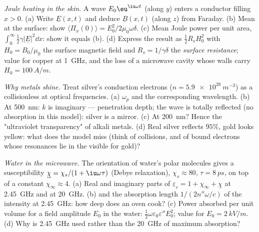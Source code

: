 \begin{exercise}[$\star\star\star$]\label{exo:b2:waves-in-media:10}
\emph{Joule heating in the skin.} A wave $E_0\eu^{\iu\omega t}$ (along $y$)
enters a conductor filling $x > 0$. (a) Write $\underline E(x, t)$ and deduce
$\underline B(x, t)$ (along $z$) from Faraday. (b) Mean  at the
surface: show $\langle\Pi_x(0)\rangle = E_0^2/2\mu_0\omega\delta$. (c) Mean Joule
power per unit area, $\int_0^\infty\tfrac12\gamma|\underline E|^2\dd x$: show it equals
(b). (d) Express the result as $\tfrac12R_sH_0^2$ with $H_0 = B_0/\mu_0$ the
surface magnetic field and $R_s = 1/\gamma\delta$ the \emph{surface
resistance}; value for copper at \qty{1}{GHz}, and the loss of a
microwave cavity whose walls carry $H_0 = \qty{100}{A/m}$.
\end{exercise}

\begin{exercise}[$\star\star\star$]\label{exo:b2:waves-in-media:11}
\emph{Why metals shine.} Treat silver's conduction electrons ($n =
\qty{5.9e28}{m^{-3}}$) as a collisionless  at optical frequencies.
(a) $\omega_p$ and the corresponding wavelength. (b) At \qty{500}{nm}: $k$ is
imaginary --- penetration depth; the wave is totally reflected (no
absorption in this model): silver is a mirror. (c) At \qty{200}{nm}? Hence
the "ultraviolet transparency" of alkali metals. (d) Real silver
reflects $95\%$, gold looks yellow: what does the model miss (think of
collisions, and of bound electrons whose resonances lie in the
visible for gold)?
\end{exercise}

\begin{exercise}[$\star\star\star$]\label{exo:b2:waves-in-media:12}
\emph{Water in the microwave.} The orientation of water's polar
molecules gives a susceptibility $\underline\chi = \chi_s/(1 + \iu\omega\tau)$ (Debye
relaxation), $\chi_s \approx 80$, $\tau = \qty{8}{ps}$, on top of a constant
$\chi_\infty \approx 4$. (a) Real and imaginary parts of $\underline\varepsilon_r = 1 + \chi_\infty
+ \underline\chi$ at \qty{2.45}{GHz} and at \qty{20}{GHz}. (b)  and the
absorption length $1/(2n''\omega/c)$ of the intensity at \qty{2.45}{GHz}: how
deep does an oven cook? (c) Power absorbed per unit volume for a
field amplitude $E_0$ in the water: $\tfrac12\omega\varepsilon_0\varepsilon''E_0^2$; value for
$E_0 = \qty{2}{kV/m}$. (d) Why is \qty{2.45}{GHz} used rather than the
\qty{20}{GHz} of maximum absorption?
\end{exercise}

